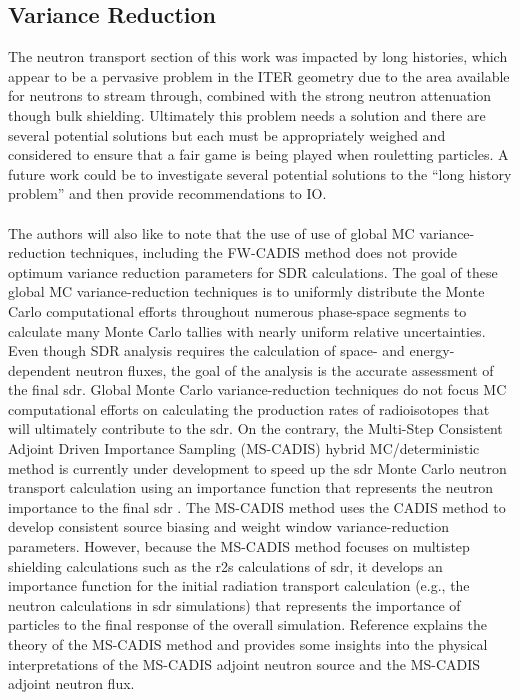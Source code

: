 \documentclass[12pt]{article}
\begin{document}
\subsection*{Variance Reduction}
The neutron transport section of this work was impacted by long histories, which appear to
be a pervasive problem in the ITER geometry due to the area available for
neutrons to stream through, combined with the strong neutron attenuation though
bulk shielding. Ultimately this problem needs a solution and there are several
potential solutions but each must be appropriately weighed and considered to
ensure that a fair game is being played when rouletting particles. A future
work could be to investigate several potential solutions to the ``long history
problem'' and then provide recommendations to IO.
\\
\\
The authors will also like to note that the use of use of global MC 
variance-reduction techniques, including the FW-CADIS method does not 
provide optimum variance reduction parameters for SDR calculations. 
The goal of these global MC variance-reduction techniques is to uniformly 
distribute the Monte Carlo computational efforts throughout numerous 
phase-space segments to calculate many Monte Carlo tallies with nearly 
uniform relative uncertainties. Even though SDR analysis requires the 
calculation of space- and energy-dependent neutron fluxes, the goal of 
the analysis is the accurate assessment of the final \gls{sdr}. Global 
Monte Carlo variance-reduction techniques do not focus MC computational 
efforts on calculating the production rates of radioisotopes that will 
ultimately contribute to the \gls{sdr}. On the contrary, the Multi-Step 
Consistent Adjoint Driven Importance Sampling (MS-CADIS) hybrid 
MC/deterministic method is currently under development to speed up the \gls{sdr}
 Monte Carlo neutron transport calculation using an importance function that 
represents the neutron importance to the final \gls{sdr} \cite{mscadis}. 
The MS-CADIS method uses the CADIS method to develop consistent source biasing 
and weight window variance-reduction parameters. However, because the MS-CADIS 
method focuses on multistep shielding calculations such as the \gls{r2s} 
calculations of \gls{sdr}, it develops an importance function for the initial 
radiation transport calculation (e.g., the neutron calculations in \gls{sdr} 
simulations) that represents the importance of particles to the final response
 of the overall simulation. Reference \cite{mscadis} explains the theory of the MS-CADIS 
method and provides some insights into the physical interpretations of the 
MS-CADIS adjoint neutron source and the MS-CADIS adjoint neutron flux.
\end{document}
